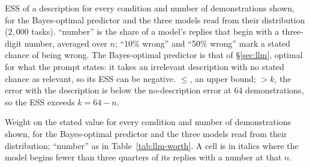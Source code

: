 \documentclass{article}
\begin{document}
\begin{table}[p]
\centering\scriptsize
\setlength{\tabcolsep}{3pt}
\caption{ESS of a description for every condition and number of demonstrations shown, for the Bayes-optimal predictor and the three models read from their distribution ($2{,}000$ tasks). ``number'' is the share of a model's replies that begin with a three-digit number, averaged over $n$; ``10\% wrong'' and ``50\% wrong'' mark a stated chance of being wrong. The Bayes-optimal predictor is that of \S\ref{sec:llm}, optimal for what the prompt states: it takes an irrelevant description with no stated chance as relevant, so its ESS can be negative. $\leq$, an upper bound; $> k$, the error with the description is below the no-description error at $64$ demonstrations, so the ESS exceeds $k = 64 - n$.}
\label{tab:llm-worth}
\vspace{3pt}

\end{table}

\begin{table}[p]
\centering\scriptsize
\setlength{\tabcolsep}{3pt}
\caption{Weight on the stated value for every condition and number of demonstrations shown, for the Bayes-optimal predictor and the three models read from their distribution; ``number'' as in Table~\ref{tab:llm-worth}. A cell is in italics where the model begins fewer than three quarters of its replies with a number at that $n$.}
\label{tab:llm-full}
\vspace{3pt}

\end{table}
\end{document}
